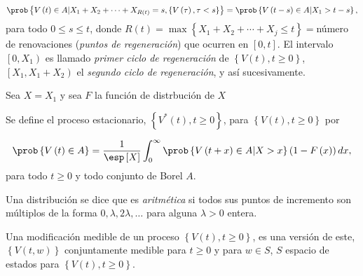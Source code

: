\begin{eqnarray*}
\prob\left\{V\left(t\right)\in A|X_{1}+X_{2}+\cdots+X_{R\left(t\right)}=s,\left\{V\left(\tau\right),\tau<s\right\}\right\}=\prob\left\{V\left(t-s\right)\in A|X_{1}>t-s\right\},
\end{eqnarray*}
para todo $0\leq s\leq t$, donde $R\left(t\right)=\max\left\{X_{1}+X_{2}+\cdots+X_{j}\leq t\right\}=$n\'umero de renovaciones ({\emph{puntos de regeneraci\'on}}) que ocurren en $\left[0,t\right]$. El intervalo $\left[0,X_{1}\right)$ es llamado {\emph{primer ciclo de regeneraci\'on}} de $\left\{V\left(t \right),t\geq0\right\}$, $\left[X_{1},X_{1}+X_{2}\right)$ el {\emph{segundo ciclo de regeneraci\'on}}, y as\'i sucesivamente.

Sea $X=X_{1}$ y sea $F$ la funci\'on de distrbuci\'on de $X$


\begin{Def}
Se define el proceso estacionario, $\left\{V^{*}\left(t\right),t\geq0\right\}$, para $\left\{V\left(t\right),t\geq0\right\}$ por

\begin{eqnarray*}
\prob\left\{V\left(t\right)\in A\right\}=\frac{1}{\esp\left[X\right]}\int_{0}^{\infty}\prob\left\{V\left(t+x\right)\in A|X>x\right\}\left(1-F\left(x\right)\right)dx,
\end{eqnarray*} 
para todo $t\geq0$ y todo conjunto de Borel $A$.
\end{Def}

\begin{Def}
Una distribuci\'on se dice que es {\emph{aritm\'etica}} si todos sus puntos de incremento son m\'ultiplos de la forma $0,\lambda, 2\lambda,\ldots$ para alguna $\lambda>0$ entera.
\end{Def}


\begin{Def}
Una modificaci\'on medible de un proceso $\left\{V\left(t\right),t\geq0\right\}$, es una versi\'on de este, $\left\{V\left(t,w\right)\right\}$ conjuntamente medible para $t\geq0$ y para $w\in S$, $S$ espacio de estados para $\left\{V\left(t\right),t\geq0\right\}$.
\end{Def}

